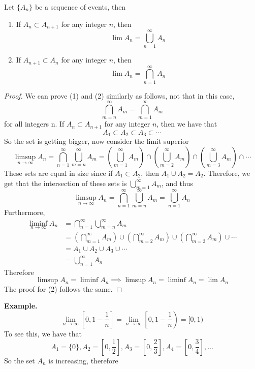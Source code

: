\documentclass[openany]{report}
\begin{document}
\begin{lemma}
    Let $\{A_n\}$ be a sequence of events, then 
    \begin{enumerate}
        \item If $A_n \subset A_{n+1}$ for any integer $n$, then 
        \[\lim A_n = \bigcup_{n=1}^\infty A_n\]
        \item If $A_{n+1} \subset A_n$ for any integer $n$, then
        \[\lim A_n = \bigcap_{n=1}^\infty A_n\]
    \end{enumerate}
\end{lemma}
\begin{proof}
    We can prove (1) and (2) similarly as follows, not that in this case, 
    \[\bigcap_{m=n}^\infty A_m = \bigcap_{m=1}^\infty A_m\]
    for all integers n. If $A_n \subset A_{n+1}$ for any integer $n$, then we have that 
    \[A_1 \subset A_2 \subset A_3 \subset \cdots \]
    So the set is getting bigger, now consider the limit superior 
    \[\limsup_{n\rightarrow\infty} A_n = \bigcap_{n=1}^\infty \bigcup_{m=n}^\infty A_m= \left(\bigcup_{m=1}^\infty A_m\right) \cap \left(\bigcup_{m=2}^\infty A_m\right) \cap \left(\bigcup_{m=3}^\infty A_m\right) \cap \cdots\]
    These sets are equal in size since if $A_1 \subset A_2$, then $A_1 \cup A_2 = A_2$. Therefore, we get that the intersection of these sets is $\bigcup\limits_{m=1}^\infty A_m$, and thus 
    \[\limsup_{n\rightarrow \infty} A_n = \bigcap_{n=1}^\infty\bigcup_{m=n}^\infty A_m = \bigcup_{n=1}^\infty A_n\]
    Furthermore, 
    \begin{align*}
        \liminf_{n\rightarrow\infty} A_n &= \bigcap_{n=1}^\infty \bigcup_{m=n}^\infty A_m\\
        &= \left(\bigcap_{m=1}^\infty A_m\right) \cup \left(\bigcap_{m=2}^\infty A_m\right) \cup \left(\bigcap_{m=3}^\infty A_m\right) \cup \cdots \\
        &=  A_1 \cup A_2 \cup A_3 \cup \cdots \\
        &= \bigcup_{n=1}^\infty A_n
    \end{align*}
    Therefore 
    \[\limsup A_n = \liminf A_n \implies \limsup A_n = \liminf A_n = \lim A_n\]
    The proof for (2) follows the same. 
\end{proof}
\noindent
\textbf{Example.} 
\[\lim_{n\rightarrow\infty} \left[0, 1 - \frac{1}{n}\right] = \lim_{n\rightarrow\infty} \left[0, 1 - \frac{1}{n}\right) = [0,1)\]
To see this, we have that 
\[A_1 = \{0\}, A_2 = \left[0,\frac{1}{2}\right], A_3 = \left[0,\frac{2}{3}\right],A_4 = \left[0,\frac{3}{4}\right], \ldots \]
So the set $A_n$ is increasing, therefore 
\end{document}

